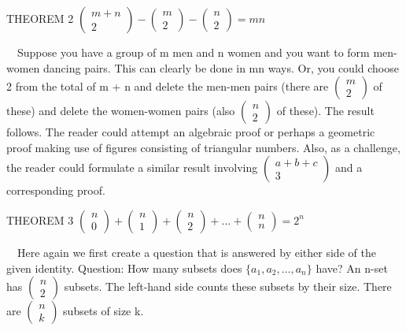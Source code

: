 \documentclass{article}
\begin{document}
THEOREM 2  
$\left(\begin{matrix}m+n\\2\end{matrix}\right)-\left(\begin{matrix}m\\2\end{matrix}\right)-\left(\begin{matrix}n\\2\end{matrix}\right)=\mathit{mn}$

\ \ Suppose you have a group of  m  men and  n women and you want to form men-women dancing pairs.  This can clearly be
done in mn ways.  Or, you could choose 2 from the total of m + n and delete the men-men pairs (there are 
$\left(\begin{matrix}m\\2\end{matrix}\right)$ of these) and delete the women-women pairs (also
$\left(\begin{matrix}n\\2\end{matrix}\right)$ of these).  The result follows.  The reader could attempt an algebraic
proof or perhaps a geometric proof making use of figures consisting of triangular numbers.  Also, as a challenge, the
reader could formulate a similar result involving  $\left(\begin{matrix}a+b+c\\3\end{matrix}\right)$ and a
corresponding proof.

THEOREM 3  
$\left(\begin{matrix}n\\0\end{matrix}\right)+\left(\begin{matrix}n\\1\end{matrix}\right)+\left(\begin{matrix}n\\2\end{matrix}\right)+{\dots}+\left(\begin{matrix}n\\n\end{matrix}\right)=2^n$

\ \ Here again we first create a question that is answered by either side of the given identity.  Question: How many
subsets does  $\{a_1,a_2,{\dots},a_n\}$ have?  An n-set has  $\left(\begin{matrix}n\\2\end{matrix}\right)$ subsets. 
The left-hand side counts these subsets by their size.  There are  $\left(\begin{matrix}n\\k\end{matrix}\right)$
subsets of size k.
\end{document}
